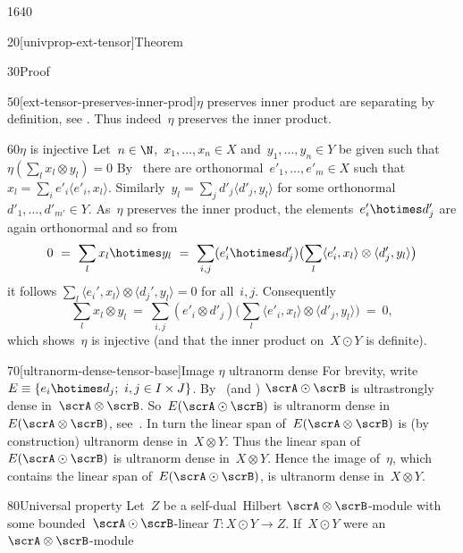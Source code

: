 \begin{parsec}{1640}
\begin{point}{20}[univprop-ext-tensor]{Theorem}
\begin{point}{30}{Proof}
\begin{point}{50}[ext-tensor-preserves-inner-prod]{$\eta$ preserves inner product}
    are separating by definition, see .
Thus indeed~$\eta$ preserves the inner product.
\end{point}
\begin{point}{60}{$\eta$ is injective}%
Let~$n \in \N$,~$x_1, \ldots, x_n \in X$
    and~$y_1,\ldots, y_n \in Y$
    be given such that~$\eta(\sum_l x_l \otimes y_l) = 0$
By~
    there are orthonormal~$e'_1,\ldots, e'_m \in X$
    such that~$x_l = \sum_i e'_i \langle e'_i, x_l\rangle$.
Similarly~$y_l = \sum_j d'_j \langle d'_j, y_l\rangle$
for some orthonormal~$d'_1, \ldots, d'_{m'} \in Y$.
As~$\eta$ preserves the inner product,
    the elements~$e_i'\hotimes d_j'$ are again orthonormal
    and so from
\begin{equation*}
    0 \ =\  \sum_l x_l \hotimes y_l
    \ =\  \sum_{i,j} (e'_i \hotimes d'_j) \bigl(\sum_l
         \langle e'_i, x_l\rangle \otimes \langle d'_j, y_l\rangle\bigr)
\end{equation*}
         it follows
         $\sum_l \langle e_i',x_l\rangle \otimes \langle d_j',y_l\rangle = 0$
         for all~$i,j$.
Consequently
\begin{equation*}
    \sum_l x_l \otimes y_l
        \ =\  \sum_{i,j} (e'_i \otimes d'_j) \bigl(\sum_l
        \langle e'_i, x_l \rangle \otimes \langle d'_j, y_l \rangle 
        \bigr) \ = \ 0,
\end{equation*}
which shows~$\eta$ is injective
    (and that the inner product on~$X \odot Y$ is definite).
\end{point}
\begin{point}{70}[ultranorm-dense-tensor-base]{Image $\eta$ ultranorm dense}%
For brevity, write~$E \equiv \{ e_i \hotimes d_j; \ i,j \in I\times J\}$.
By~ (and )
    $\scrA \odot \scrB$ is ultrastrongly dense in~$\scrA \otimes \scrB$.
So~$E (\scrA \odot \scrB)$
    is ultranorm dense in~$E (\scrA \otimes \scrB)$,
    see~.
In turn the linear span of~$E (\scrA \otimes \scrB)$
    is (by construction) ultranorm dense in~$X \otimes Y$.
Thus the linear span of~$E (\scrA \odot \scrB)$
    is ultranorm dense in~$X \otimes Y$.
Hence the image of~$\eta$,
    which contains the linear span of~$E (\scrA \odot \scrB)$,
    is ultranorm dense in~$X \otimes Y$.
\end{point}
\begin{point}{80}{Universal property}%
Let~$Z$ be a self-dual~Hilbert $\scrA \otimes \scrB$-module
 with some bounded~$\scrA \odot \scrB$-linear $T\colon X \odot Y \to Z$.
If~$X \odot Y$ were an~$\scrA \otimes \scrB$-module

\end{point}
\end{point}
\end{point}
\end{parsec}
